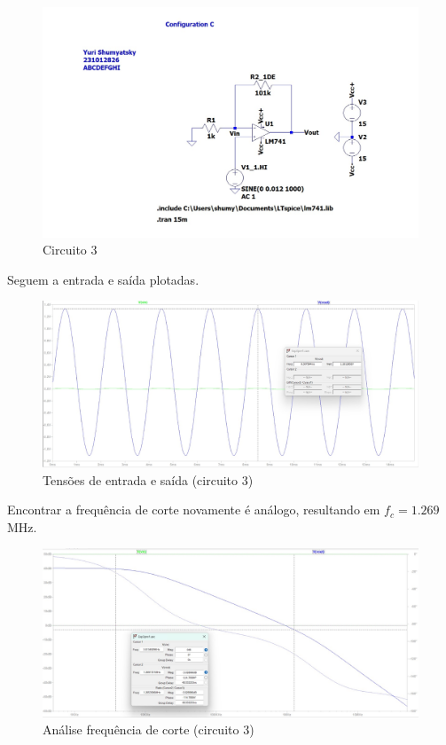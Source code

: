 \documentclass[10pt,twocolumn,letterpaper]{article}
\begin{document}
\begin{figure}[h]
\caption{Circuito 3}
\begin{center}
\includegraphics[scale=0.2]{figuras/fig11}
\end{center}
\end{figure}

Seguem a entrada e saída plotadas.

\begin{figure}[h]
\caption{Tensões de entrada e saída (circuito 3)}
\begin{center}
\includegraphics[scale=0.15]{figuras/fig12}
\end{center}
\end{figure}

Encontrar a frequência de corte novamente é análogo, resultando em $f_c=1.269$MHz.

\begin{figure}[h]
\caption{Análise frequência de corte (circuito 3)}
\begin{center}
\includegraphics[scale=0.15]{figuras/fig13}
\end{center}
\end{figure}
\end{document}
